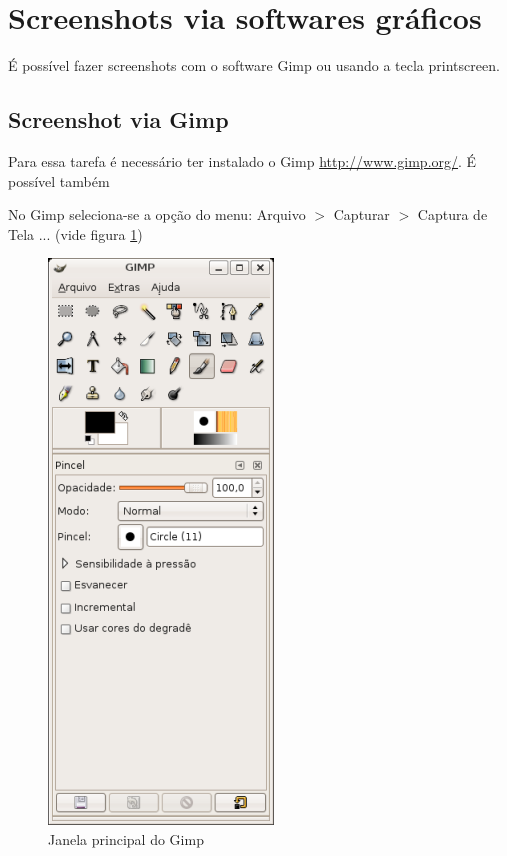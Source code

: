 \documentclass[12pt,brazil]{book}
\begin{document}
\section{Screenshots via softwares gráficos}
\label{sec:scre-via-softw}

É possível fazer screenshots com o software Gimp ou usando a tecla
printscreen.

\subsection{Screenshot via Gimp}
\label{sec:screenshot-via-gimp}

Para essa tarefa é necessário ter instalado o Gimp
\url{http://www.gimp.org/}. É possível também 

No Gimp seleciona-se a opção do menu: Arquivo $>$ Capturar $>$ Captura
de Tela ... (vide figura \ref{fig:janela-gimp})

\begin{figure}[!h]
  \centering
  \includegraphics[scale=.7]{gimp-screen}
  \caption{Janela principal do Gimp}
  \label{fig:janela-gimp}
\end{figure}
\end{document}
